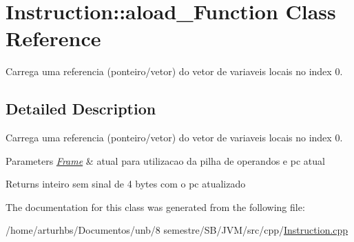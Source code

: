 \hypertarget{classInstruction_1_1aload__0Function}{}\section{Instruction\+:\+:aload\+\_\+Function Class Reference}
\label{classInstruction_1_1aload__0Function}


Carrega uma referencia (ponteiro/vetor) do vetor de variaveis locais no index 0.  




\subsection{Detailed Description}
Carrega uma referencia (ponteiro/vetor) do vetor de variaveis locais no index 0. 


\begin{DoxyParams}{Parameters}
{\em \hyperlink{classFrame}{Frame}} & atual para utilizacao da pilha de operandos e pc atual \\
\hline
\end{DoxyParams}
\begin{DoxyReturn}{Returns}
inteiro sem sinal de 4 bytes com o pc atualizado 
\end{DoxyReturn}


The documentation for this class was generated from the following file\+:\begin{DoxyCompactItemize}
\item 
/home/arturhbs/\+Documentos/unb/8 semestre/\+S\+B/\+J\+V\+M/src/cpp/\hyperlink{Instruction_8cpp}{Instruction.\+cpp}\end{DoxyCompactItemize}
